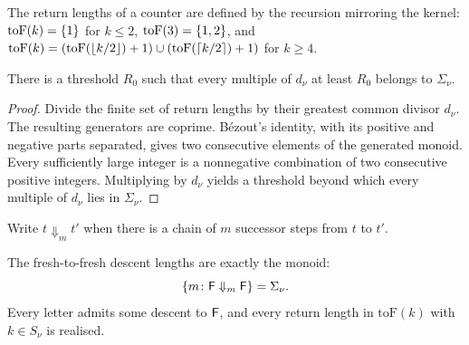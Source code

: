 \begin{definition}
\label{def:renewal}
\leanok
The return lengths of a counter are defined by the recursion mirroring the kernel:
$\mathrm{toF}(k)=\{1\}$ for $k\leq2$, $\mathrm{toF}(3)=\{1,2\}$, and
$\mathrm{toF}(k)=(\mathrm{toF}(\lfloor k/2 \rfloor)+1)\cup(\mathrm{toF}(\lceil k/2 \rceil)+1)$ for $k\geq4$.
\end{definition}

\begin{lemma}
\label{thm:semigroup}
\leanok
{}
There is a threshold $R_0$ such that every multiple of $d_\nu$ at least $R_0$ belongs to
$\Sigma_\nu$.
\end{lemma}

\begin{proof}
\leanok
Divide the finite set of return lengths by their greatest common divisor $d_\nu$. The resulting
generators are coprime. B\'ezout's identity, with its positive and negative parts separated, gives
two consecutive elements of the generated monoid. Every sufficiently large integer is a
nonnegative combination of two consecutive positive integers. Multiplying by $d_\nu$ yields a
threshold beyond which every multiple of $d_\nu$ lies in $\Sigma_\nu$.
\end{proof}

\begin{definition}
\label{def:descend}
\leanok
{}
Write $t\Downarrow_m t'$ when there is a chain of $m$ successor steps from $t$ to $t'$.
\end{definition}

\begin{lemma}
\label{thm:descend-realise}
\leanok
{}
The fresh-to-fresh descent lengths are exactly the monoid:
\[
 \{m\colon\mathsf{F}\Downarrow_m\mathsf{F}\}=\Sigma_\nu.
\]
Every letter admits some descent to $\mathsf{F}$, and every return length in $\mathrm{toF}(k)$ with
$k\in S_\nu$ is realised.
\end{lemma}

